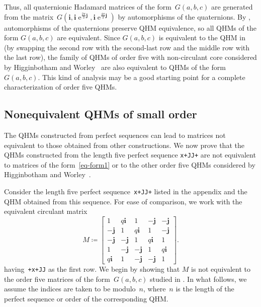 \documentclass[12pt]{article}
\numberwithin{equation}{section}
\newcommand{\qi}{\mathbf{i}}
\newcommand{\qj}{\mathbf{j}}
\newcommand{\eqdef}{\coloneqq}
\DeclareMathOperator{\e}{e}
\begin{document}
Thus, all quaternionic Hadamard matrices of the form~$G(a,b,c)$ are generated from the matrix~$G(\qi, \qi \e^{\frac{2\pi}{3} \qj}, \qi \e^{\frac{4\pi}{3} \qj})$ by automorphisms of the quaternions.
By , automorphisms of the quaternions preserve QHM equivalence, so all QHMs of the form $G(a,b,c)$ are equivalent.
Since $G(a,b,c)$ is equivalent to the QHM in~\cite[Example~3]{HW22-qhm} (by swapping
the second row with the second-last row and the middle row with the last row),
the family of QHMs of order five with non-circulant core considered by
Higginbotham and Worley~\cite{HW22-qhm} are also equivalent to QHMs of the form $G(a,b,c)$.
This kind of analysis may be a good starting point for a complete characterization of order five QHMs.

\subsection{Nonequivalent QHMs of small order}
\label{sec-new-qhm}

The QHMs constructed from perfect sequences can lead to matrices not equivalent to those obtained from other constructions.
We now prove that the QHMs constructed from the length five perfect sequence \verb|x+JJ+|
are not equivalent to matrices of the form~\eqref{eq-form1} or to the other order
five QHMs considered by Higginbotham and Worley~\cite{HW22-qhm}.

Consider the length five perfect sequence~\verb|x+JJ+| listed in the appendix and the QHM obtained from this sequence. For ease of comparison, we work with the equivalent circulant matrix
\begin{equation}
\label{eq-m1}
M \eqdef
\begin{bmatrix}
1 & q \qi & 1 & -\qj & -\qj \\
-\qj & 1 & q \qi & 1 & -\qj \\
-\qj & -\qj & 1 & q \qi & 1 \\
1 & -\qj & -\qj & 1 & q \qi \\
q \qi & 1 & -\qj & -\qj & 1 
\end{bmatrix} .
\end{equation}
having~\verb|+x+JJ| as the first row.
We begin by showing that $M$ is not equivalent to the order five matrices of the form~$G(a,b,c)$ studied in . In what follows, we assume the indices are taken to be modulo~$n$, where~$n$ is the length of the perfect sequence or order of the corresponding QHM\@.
\end{document}
